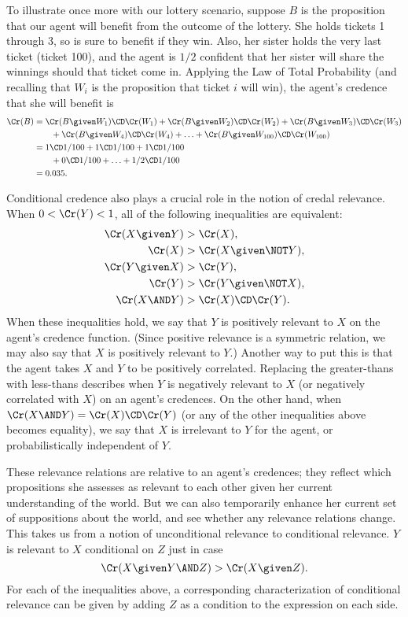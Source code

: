 To illustrate once more with our lottery scenario, suppose $B$ is the proposition that our agent will benefit from the outcome of the lottery. She holds tickets 1 through 3, so is sure to benefit if they win. Also, her sister holds the very last ticket (ticket 100), and the agent is $1/2$ confident that her sister will share the winnings should that ticket come in. Applying the Law of Total Probability (and recalling that $W_i$ is the proposition that ticket $i$ will win), the agent's credence that she will benefit is
\begin{equation}
\begin{aligned}
\Cr(B) &= \Cr(B \given W_1)\CD\Cr(W_1)+\Cr(B \given W_2)\CD\Cr(W_2)+\Cr(B \given W_3)\CD\Cr(W_3)\\
	   &\qquad +\Cr(B \given W_4)\CD\Cr(W_4)+\ldots+\Cr(B \given W_{100})\CD\Cr(W_{100})\\
	   &= 1 \CD 1/100 + 1 \CD 1/100 + 1 \CD 1/100\\
	   &\qquad + 0 \CD 1/100 + \ldots + 1/2 \CD 1/100\\
	   &=0.035.
\end{aligned}
\end{equation}

Conditional credence also plays a crucial role in the notion of credal relevance. When $0<\Cr(Y)<1$, all of the following inequalities are equivalent:
\begin{align}
\Cr(X \given Y) &> \Cr(X),\\
\Cr(X) &> \Cr(X \given \NOT Y),\\
\Cr(Y \given X) &> \Cr(Y),\\
\Cr(Y) &> \Cr(Y \given \NOT X),\\
\Cr(X \AND Y) &> \Cr(X) \CD \Cr(Y).
\end{align} 
When these inequalities hold, we say that $Y$ is positively relevant to $X$ on the agent's credence function. (Since positive relevance is a symmetric relation, we may also say that $X$ is positively relevant to $Y$.) Another way to put this is that the agent takes $X$ and $Y$ to be positively correlated. Replacing the greater-thans with less-thans describes when $Y$ is negatively relevant to $X$ (or negatively correlated with $X$) on an agent's credences. On the other hand, when $\Cr(X \AND Y)=\Cr(X) \CD \Cr(Y)$ (or any of the other inequalities above becomes equality), we say that $X$ is irrelevant to $Y$ for the agent, or probabilistically independent of $Y$.

These relevance relations are relative to an agent's credences; they reflect which propositions she assesses as relevant to each other given her current understanding of the world. But we can also temporarily enhance her current set of suppositions about the world, and see whether any relevance relations change. This takes us from a notion of unconditional relevance to conditional relevance. $Y$ is relevant to $X$ conditional on $Z$ just in case
\begin{equation}
\Cr(X \given Y \AND Z)>\Cr(X \given Z).
\end{equation}
For each of the inequalities above, a corresponding characterization of conditional relevance can be given by adding $Z$ as a condition to the expression on each side.

